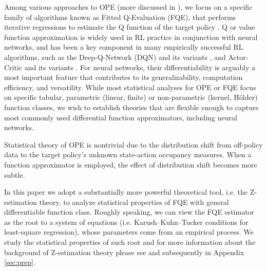 \documentclass{article}
\def\mw#1{\textcolor{red}{mw:#1}}
\numberwithin{equation}{section}
\newcommand{\pref}[1]{\prettyref{#1}}
\theoremstyle{plain}
\theoremstyle{definition}
\theoremstyle{remark}
\begin{document}
Among various approaches to OPE (more discussed in \pref{sec:related_work}), we focus on a specific family of algorithms known as Fitted Q-Evaluation (FQE), that performs iterative regressions to estimate the Q function of the target policy \citep{munos2008finite,le2019batch}. Q or value function approximation is widely used in RL practice in conjunction with neural networks, and has been a key component in many empirically successful RL algorithms, such as the Deep-Q-Network (DQN) and its variants \citep{mnih2013playing}, and Actor-Critic and its variants \citep{mnih2016asynchronous}.
For neural networks, their differentiability is arguably a most important feature that contributes to its generalizability, computation efficiency, and versatility. While most statistical analyses for OPE or FQE focus on specific tabular, parametric (linear, finite) or non-parametric (kernel, Hölder) function classes, we wish to establish theories that are flexible enough to capture most commonly used differential function approximators, including neural networks. 

Statistical theory of OPE is nontrivial due to the distribution shift from off-policy data to the target policy's unknown state-action occupancy measures. When a function approximator is employed, the effect of distribution shift becomes more subtle. 

 In this paper we adopt a substantially more powerful theoretical tool, i.e. the Z-estimation theory, to analyze statistical properties of FQE with general differentiable function class. Roughly speaking, we can view the FQE estimator as the root to a system of equations (i.e. Karush–Kuhn–Tucker conditions for least-square regression), whose parameters come from an empirical process. We study the statistical properties of such root and for more information about the background of Z-estimation theory please see \pref{sec:z} and subsequently in Appendix \ref{sec:prep}.
 
 
\end{document}
